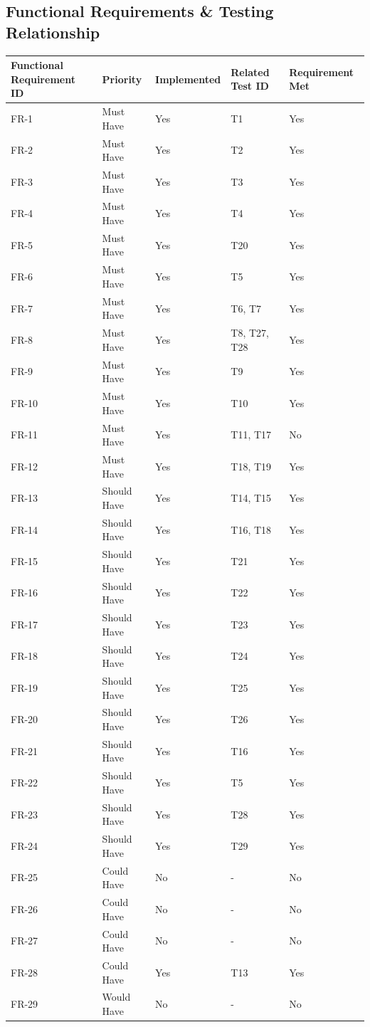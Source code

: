 \documentclass{l4proj}
\begin{document}
\begin{appendices}
\chapter{Functional Requirements \& Testing Relationship}

\begin{tabular}{| p{2.5cm}| l | l | l | l |}
\hline
\textbf{Functional Requirement ID} &\textbf{Priority} & \textbf{Implemented} & \textbf{Related Test ID} & \textbf{Requirement Met}\\
\hline
\hline
FR-1 & Must Have & Yes & T1 & Yes\\
\hline
FR-2 & Must Have & Yes & T2 & Yes\\
\hline
FR-3 & Must Have & Yes & T3 & Yes\\
\hline
FR-4 & Must Have & Yes & T4 & Yes\\
\hline
FR-5 & Must Have & Yes & T20 & Yes\\
\hline
FR-6 & Must Have & Yes & T5 & Yes\\
\hline
FR-7 & Must Have & Yes & T6, T7 & Yes\\
\hline
FR-8 & Must Have & Yes & T8, T27, T28 & Yes\\
\hline
FR-9 & Must Have & Yes & T9 & Yes\\
\hline
FR-10 &Must Have & Yes & T10 & Yes\\
\hline
FR-11 &Must Have & Yes & T11, T17 & No\\
\hline
FR-12 & Must Have &Yes & T18, T19 & Yes\\
\hline
\hline
FR-13 & Should Have & Yes & T14, T15 & Yes\\
\hline
FR-14 & Should Have & Yes & T16, T18 & Yes\\
\hline
FR-15 & Should Have & Yes & T21 & Yes\\
\hline
FR-16 & Should Have & Yes & T22 & Yes\\
\hline
FR-17 & Should Have & Yes & T23 & Yes\\
\hline
FR-18 & Should Have & Yes & T24 & Yes\\
\hline
FR-19 & Should Have & Yes & T25 & Yes\\
\hline
FR-20 & Should Have & Yes & T26 & Yes\\
\hline
FR-21 & Should Have & Yes & T16 & Yes\\
\hline
FR-22 & Should Have & Yes & T5 & Yes\\
\hline
FR-23 & Should Have & Yes & T28 & Yes\\
\hline
FR-24 & Should Have & Yes & T29 & Yes\\
\hline
\hline
FR-25 & Could Have & No & - & No \\
\hline
FR-26 &Could Have & No & -& No \\
\hline
FR-27 &Could Have & No & - & No \\
\hline
FR-28 & Could Have &Yes & T13 & Yes\\
\hline
\hline
FR-29 &Would Have & No & - & No \\
\hline


\end{tabular}
\end{appendices}
\end{document}
